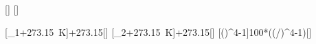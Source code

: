[\degreeCelsius]
[\degreeCelsius]

[\vartheta_1+\SI{273.15}{\kelvin}]{\tvX+273.15}[\kelvin]
[\vartheta_2+\SI{273.15}{\kelvin}]{\tnX+273.15}[\kelvin]
[\left(\right)^4-1]{100*((\TnX/\TvX)^4-1)}[\percent]
